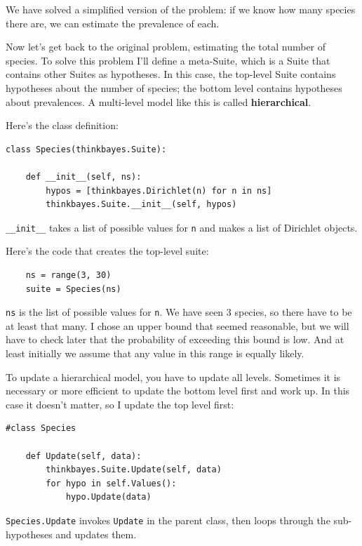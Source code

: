 \documentclass[12pt]{book}
\begin{document}
We have solved a simplified version of the problem: if we
know how many species there are, we can estimate the prevalence
of each.

Now let's get back to the original problem, estimating the total
number of species.  To solve this problem I'll define a meta-Suite,
which is a Suite that contains other Suites as hypotheses.  In this
case, the top-level Suite contains hypotheses about the number of
species; the bottom level contains hypotheses about prevalences.
A multi-level model like this is called {\bf hierarchical}.

Here's the class definition:

\begin{verbatim}
class Species(thinkbayes.Suite):

    def __init__(self, ns):
        hypos = [thinkbayes.Dirichlet(n) for n in ns]
        thinkbayes.Suite.__init__(self, hypos)
\end{verbatim}

\verb"__init__" takes a list of possible values for {\tt n} and
makes a list of Dirichlet objects.

Here's the code that creates the top-level suite:

\begin{verbatim}
    ns = range(3, 30)
    suite = Species(ns)
\end{verbatim}

{\tt ns} is the list of possible values for {\tt n}.  We have seen 3
species, so there have to be at least that many.  I chose an upper
bound that seemed reasonable, but we will have to check later that the
probability of exceeding this bound is low.  And at least initially
we assume that any value in this range is equally likely.

To update a hierarchical model, you have to update all levels.
Sometimes it is necessary or more efficient to update the bottom
level first and work up.  In this case it doesn't matter, so
I update the top level first:

\begin{verbatim}
#class Species

    def Update(self, data):
        thinkbayes.Suite.Update(self, data)
        for hypo in self.Values():
            hypo.Update(data)
\end{verbatim}

{\tt Species.Update} invokes {\tt Update} in the parent class,
then loops through the sub-hypotheses and updates them.
\end{document}
